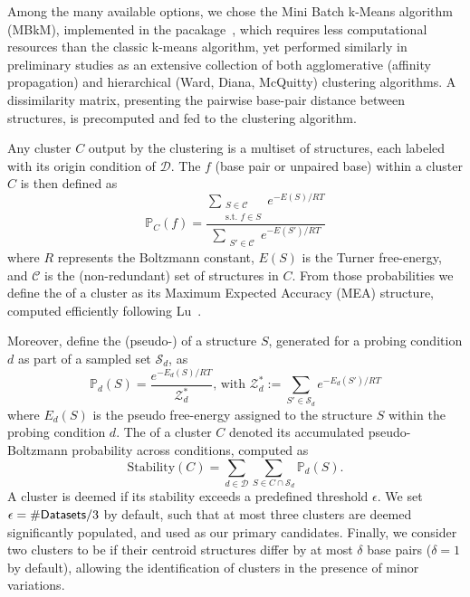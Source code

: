 \documentclass[9pt,hyperref]{article} %
\begin{document}
\begin{enumerate}[resume]
{{				Among the many available options, we chose the Mini Batch k-Means algorithm~\citep{Sculley2010} (MBkM), implemented in the  pacakage~\cite{Pedregosa2012}, which requires less computational resources than the classic k-means algorithm, yet performed similarly in preliminary studies as an extensive collection of both agglomerative (affinity propagation) and hierarchical (Ward, Diana, McQuitty) clustering algorithms. A dissimilarity matrix, presenting the pairwise base-pair distance between structures, is precomputed and fed to the clustering algorithm.
				
				Any cluster $C$ output by the clustering is a multiset of structures, each labeled with its origin condition of $\mathcal{D}$.
				The  $f$ (base pair or unpaired base) within a cluster $C$ is then defined as 
				$$ \mathbb{P}_C(f) = \frac{\sum_{\substack{S\in \mathcal{C}\\\text{s.t. } f\in S}} e^{-E(S)/RT}}{\sum_{\substack{S'\in \mathcal{C}}} e^{-E(S')/RT}} $$ 
				where $R$ represents the Boltzmann constant, $E(S)$ is the Turner free-energy, and $\mathcal{C}$ is the (non-redundant) set of structures in $C$. From those probabilities we define the  of a cluster as its Maximum Expected Accuracy (MEA) structure, computed efficiently following Lu\etal~\citep{Lu2009}.
				
				Moreover, define the (pseudo-) of a structure $S$, generated for a probing condition $d$ as part of a sampled  set $\mathcal{S}_d$, as
				$$\mathbb{P}_d(S) = \frac{e^{-E_d(S)/RT}}{\mathcal{Z}^*_d} \text{, with } \mathcal{Z}^*_d := \sum_{S'\in \mathcal{S}_d} e^{-E_d(S')/RT}$$
				where $E_d(S)$ is the pseudo free-energy assigned to the structure $S$ within the probing condition $d$.
				The  of a cluster $C$ denoted its accumulated pseudo-Boltzmann probability across conditions, computed as
				$$\text{Stability}(C) = \sum_{d\in \mathcal{D}} \sum_{S\in C\cap \mathcal{S}_d}  \mathbb{P}_d(S).$$
				A cluster is deemed  if its stability exceeds a predefined threshold $\epsilon$. 
				We set  $\epsilon =\#{\sf Datasets}/3$ by default, such that at most three clusters are deemed significantly populated, and used as our primary candidates.
				Finally, we consider two clusters to be  if their centroid structures differ by at most $\delta$ base pairs ($\delta=1$ by default), allowing the identification of clusters in the presence of minor variations.
				
}}
\end{enumerate}
\end{document}
